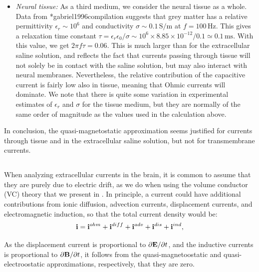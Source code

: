 \begin{itemize}
\item \textit{Neural tissue:} As a third medium, we consider the neural tissue as a whole. Data from \citeasnoun**{gabriel1996compilation} suggests that grey matter has a relative permittivity $\epsilon_r \sim 10^6$ and conductivity $\sigma \sim 0.1 \, \si{\siemens\per\metre}$ at $f = 100 \, \si{\hertz}$. This gives a relaxation time constant $\tau = \epsilon_r \epsilon_0/\sigma \sim 10^6\times 8.85\times10^{-12}/0.1 \simeq 0.1 \, \si{\milli\second}$. With this value, we get $2 \pi f \tau =  0.06$. This is much larger than for the extracellular saline solution, and reflects the fact that currents passing through tissue will not solely be in contact with the saline solution, but may also interact with neural membranes. Nevertheless, the relative contribution of the capacitive current is fairly low also in tissue, meaning that Ohmic currents will dominate. We note that there is quite some variation in experimental estimates of  $\epsilon_r$ and $\sigma$ for the tissue medium, but they are normally of the same order of magnitude as the values used in the calculation above.
\end{itemize}

In conclusion, the quasi-magnetostatic approximation seems justified for currents through tissue and in the extracellular saline solution, but not for transmembrane currents.


\subsection{}
\label{sec:Basics:onlyohmic}
When analyzing extracellular currents in the brain, it is common to assume that they are purely due to electric drift, as we do when using the volume conductor (VC) theory that we present in . In principle, a current could have additional contributions from ionic diffusion, advection currents, displacement currents, and electromagnetic induction, so that the total current density would be:
\begin{equation}
{\bf i} = {\bf i}^{ohm} + {\bf i}^{diff} + {\bf i}^{adv} + {\bf i}^{dis} + {\bf i}^{ind}, 
\label{VC:eq:generalcurrent}
\end{equation}

As the displacement current is proportional to $\partial {\bf E}/\partial t$, and the inductive currents is proportional to $\partial {\bf B}/\partial t$, it follows from the quasi-magnetoostatic and quasi-electroostatic approximations, respectively, that they are zero. 

